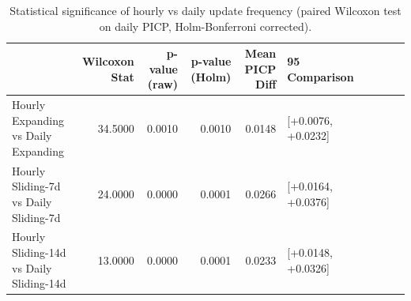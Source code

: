 \begin{table}
\caption{Statistical significance of hourly vs daily update frequency (paired Wilcoxon test on daily PICP, Holm-Bonferroni corrected).}
\label{tab:t5b5_statistical_significance}
\begin{tabular}{lrrrrl}
\toprule
 & Wilcoxon Stat & p-value (raw) & p-value (Holm) & Mean PICP Diff & 95%
Comparison &  &  &  &  &  \\
\midrule
Hourly Expanding vs Daily Expanding & 34.5000 & 0.0010 & 0.0010 & 0.0148 & [+0.0076, +0.0232] \\
Hourly Sliding-7d vs Daily Sliding-7d & 24.0000 & 0.0000 & 0.0001 & 0.0266 & [+0.0164, +0.0376] \\
Hourly Sliding-14d vs Daily Sliding-14d & 13.0000 & 0.0000 & 0.0001 & 0.0233 & [+0.0148, +0.0326] \\
\bottomrule
\end{tabular}
\end{table}
